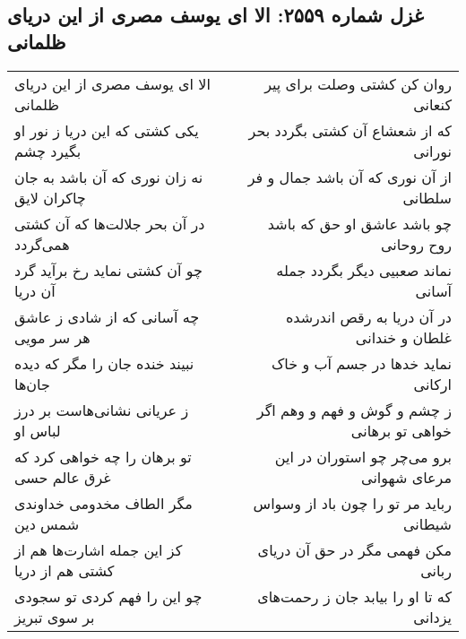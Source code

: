 \begin{center}
\section*{غزل شماره ۲۵۵۹: الا ای یوسف مصری از این دریای ظلمانی}
\label{sec:2559}
\begin{longtable}{l p{0.5cm} r}
الا ای یوسف مصری از این دریای ظلمانی
&&
روان کن کشتی وصلت برای پیر کنعانی
\\
یکی کشتی که این دریا ز نور او بگیرد چشم
&&
که از شعشاع آن کشتی بگردد بحر نورانی
\\
نه زان نوری که آن باشد به جان چاکران لایق
&&
از آن نوری که آن باشد جمال و فر سلطانی
\\
در آن بحر جلالت‌ها که آن کشتی همی‌گردد
&&
چو باشد عاشق او حق که باشد روح روحانی
\\
چو آن کشتی نماید رخ برآید گرد آن دریا
&&
نماند صعبیی دیگر بگردد جمله آسانی
\\
چه آسانی که از شادی ز عاشق هر سر مویی
&&
در آن دریا به رقص اندرشده غلطان و خندانی
\\
نبیند خنده جان را مگر که دیده جان‌ها
&&
نماید خدها در جسم آب و خاک ارکانی
\\
ز عریانی نشانی‌هاست بر درز لباس او
&&
ز چشم و گوش و فهم و وهم اگر خواهی تو برهانی
\\
تو برهان را چه خواهی کرد که غرق عالم حسی
&&
برو می‌چر چو استوران در این مرعای شهوانی
\\
مگر الطاف مخدومی خداوندی شمس دین
&&
رباید مر تو را چون باد از وسواس شیطانی
\\
کز این جمله اشارت‌ها هم از کشتی هم از دریا
&&
مکن فهمی مگر در حق آن دریای ربانی
\\
چو این را فهم کردی تو سجودی بر سوی تبریز
&&
که تا او را بیابد جان ز رحمت‌های یزدانی
\\
\end{longtable}
\end{center}
